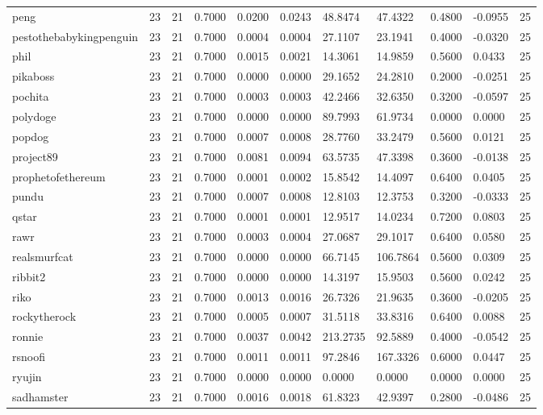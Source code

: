 \begin{table}[htbp]
\begin{tabular}{lllllllllll}
peng & 23 & 21 & 0.7000 & 0.0200 & 0.0243 & 48.8474 & 47.4322 & 0.4800 & -0.0955 & 25 \\
pestothebabykingpenguin & 23 & 21 & 0.7000 & 0.0004 & 0.0004 & 27.1107 & 23.1941 & 0.4000 & -0.0320 & 25 \\
phil & 23 & 21 & 0.7000 & 0.0015 & 0.0021 & 14.3061 & 14.9859 & 0.5600 & 0.0433 & 25 \\
pikaboss & 23 & 21 & 0.7000 & 0.0000 & 0.0000 & 29.1652 & 24.2810 & 0.2000 & -0.0251 & 25 \\
pochita & 23 & 21 & 0.7000 & 0.0003 & 0.0003 & 42.2466 & 32.6350 & 0.3200 & -0.0597 & 25 \\
polydoge & 23 & 21 & 0.7000 & 0.0000 & 0.0000 & 89.7993 & 61.9734 & 0.0000 & 0.0000 & 25 \\
popdog & 23 & 21 & 0.7000 & 0.0007 & 0.0008 & 28.7760 & 33.2479 & 0.5600 & 0.0121 & 25 \\
project89 & 23 & 21 & 0.7000 & 0.0081 & 0.0094 & 63.5735 & 47.3398 & 0.3600 & -0.0138 & 25 \\
prophetofethereum & 23 & 21 & 0.7000 & 0.0001 & 0.0002 & 15.8542 & 14.4097 & 0.6400 & 0.0405 & 25 \\
pundu & 23 & 21 & 0.7000 & 0.0007 & 0.0008 & 12.8103 & 12.3753 & 0.3200 & -0.0333 & 25 \\
qstar & 23 & 21 & 0.7000 & 0.0001 & 0.0001 & 12.9517 & 14.0234 & 0.7200 & 0.0803 & 25 \\
rawr & 23 & 21 & 0.7000 & 0.0003 & 0.0004 & 27.0687 & 29.1017 & 0.6400 & 0.0580 & 25 \\
realsmurfcat & 23 & 21 & 0.7000 & 0.0000 & 0.0000 & 66.7145 & 106.7864 & 0.5600 & 0.0309 & 25 \\
ribbit2 & 23 & 21 & 0.7000 & 0.0000 & 0.0000 & 14.3197 & 15.9503 & 0.5600 & 0.0242 & 25 \\
riko & 23 & 21 & 0.7000 & 0.0013 & 0.0016 & 26.7326 & 21.9635 & 0.3600 & -0.0205 & 25 \\
rockytherock & 23 & 21 & 0.7000 & 0.0005 & 0.0007 & 31.5118 & 33.8316 & 0.6400 & 0.0088 & 25 \\
ronnie & 23 & 21 & 0.7000 & 0.0037 & 0.0042 & 213.2735 & 92.5889 & 0.4000 & -0.0542 & 25 \\
rsnoofi & 23 & 21 & 0.7000 & 0.0011 & 0.0011 & 97.2846 & 167.3326 & 0.6000 & 0.0447 & 25 \\
ryujin & 23 & 21 & 0.7000 & 0.0000 & 0.0000 & 0.0000 & 0.0000 & 0.0000 & 0.0000 & 25 \\
sadhamster & 23 & 21 & 0.7000 & 0.0016 & 0.0018 & 61.8323 & 42.9397 & 0.2800 & -0.0486 & 25 \\

\end{tabular}
\end{table}
